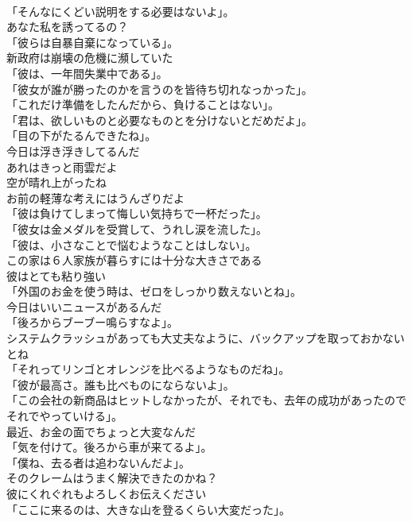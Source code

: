 \documentclass[8pt]{extreport}
\begin{document}
\begin{CJK}{UTF8}{min}
\\	「そんなにくどい説明をする必要はないよ」。	
\\	あなた私を誘ってるの？	
\\	「彼らは自暴自棄になっている」。	
\\	新政府は崩壊の危機に瀕していた	
\\	「彼は、一年間失業中である」。	
\\	「彼女が誰が勝ったのかを言うのを皆待ち切れなっかった」。	
\\	「これだけ準備をしたんだから、負けることはない」。	
\\	「君は、欲しいものと必要なものとを分けないとだめだよ」。	
\\	「目の下がたるんできたね」。	
\\	今日は浮き浮きしてるんだ	
\\	あれはきっと雨雲だよ	
\\	空が晴れ上がったね	
\\	お前の軽薄な考えにはうんざりだよ	
\\	「彼は負けてしまって悔しい気持ちで一杯だった」。	
\\	「彼女は金メダルを受賞して、うれし涙を流した」。	
\\	「彼は、小さなことで悩むようなことはしない」。	
\\	この家は６人家族が暮らすには十分な大きさである	
\\	彼はとても粘り強い	
\\	「外国のお金を使う時は、ゼロをしっかり数えないとね」。	
\\	今日はいいニュースがあるんだ	
\\	「後ろからブーブー鳴らすなよ」。	
\\	システムクラッシュがあっても大丈夫なように、バックアップを取っておかないとね	
\\	「それってリンゴとオレンジを比べるようなものだね」。	
\\	「彼が最高さ。誰も比べものにならないよ」。	
\\	「この会社の新商品はヒットしなかったが、それでも、去年の成功があったのでそれでやっていける」。	
\\	最近、お金の面でちょっと大変なんだ	
\\	「気を付けて。後ろから車が来てるよ」。	
\\	「僕ね、去る者は追わないんだよ」。	
\\	そのクレームはうまく解決できたのかね？	
\\	彼にくれぐれもよろしくお伝えください	
\\	「ここに来るのは、大きな山を登るくらい大変だった」。	

\end{CJK}
\end{document}
